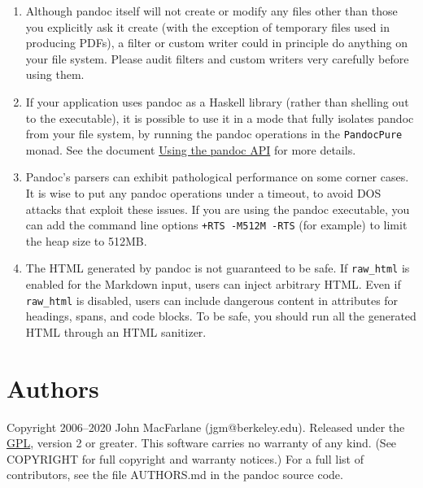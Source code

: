 \documentclass[]{article}
\begin{document}
\begin{enumerate}
\def\labelenumi{\arabic{enumi}.}
\item
  Although pandoc itself will not create or modify any files other than
  those you explicitly ask it create (with the exception of temporary
  files used in producing PDFs), a filter or custom writer could in
  principle do anything on your file system. Please audit filters and
  custom writers very carefully before using them.
\item
  If your application uses pandoc as a Haskell library (rather than
  shelling out to the executable), it is possible to use it in a mode
  that fully isolates pandoc from your file system, by running the
  pandoc operations in the \texttt{PandocPure} monad. See the document
  \href{https://pandoc.org/using-the-pandoc-api.html}{Using the pandoc
  API} for more details.
\item
  Pandoc's parsers can exhibit pathological performance on some corner
  cases. It is wise to put any pandoc operations under a timeout, to
  avoid DOS attacks that exploit these issues. If you are using the
  pandoc executable, you can add the command line options
  \texttt{+RTS\ -M512M\ -RTS} (for example) to limit the heap size to
  512MB.
\item
  The HTML generated by pandoc is not guaranteed to be safe. If
  \texttt{raw\_html} is enabled for the Markdown input, users can inject
  arbitrary HTML. Even if \texttt{raw\_html} is disabled, users can
  include dangerous content in attributes for headings, spans, and code
  blocks. To be safe, you should run all the generated HTML through an
  HTML sanitizer.
\end{enumerate}

\hypertarget{authors}{%
\section{Authors}\label{authors}}

Copyright 2006--2020 John MacFarlane (jgm@berkeley.edu). Released under
the \href{https://www.gnu.org/copyleft/gpl.html}{GPL}, version 2 or
greater. This software carries no warranty of any kind. (See COPYRIGHT
for full copyright and warranty notices.) For a full list of
contributors, see the file AUTHORS.md in the pandoc source code.
\end{document}
